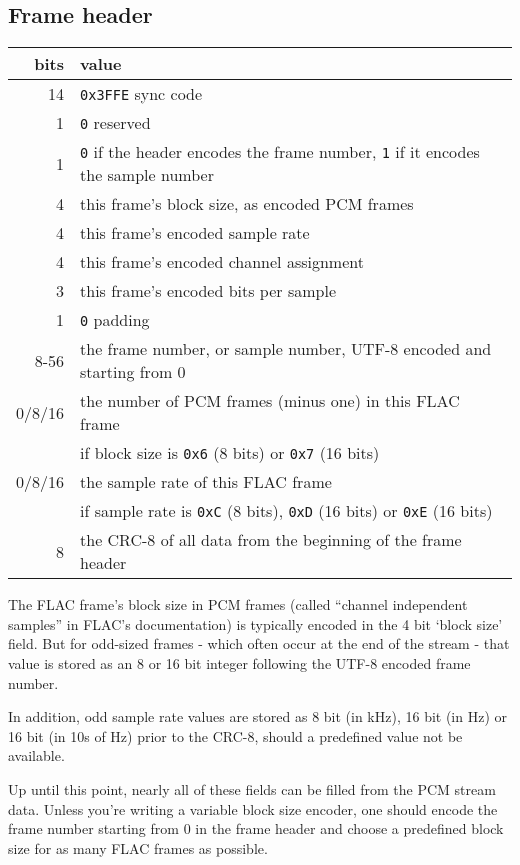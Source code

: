 \subsection{Frame header}
\begin{table}[h]
\begin{tabular}{|r|l|}
\hline
bits & value \\
\hline
14 & \texttt{0x3FFE} sync code \\
1 & \texttt{0} reserved \\
1 & \texttt{0} if the header encodes the frame number, \texttt{1} if it encodes the sample number \\
4 & this frame's block size, as encoded PCM frames \\
4 & this frame's encoded sample rate \\
4 & this frame's encoded channel assignment \\
3 & this frame's encoded bits per sample \\
1 & \texttt{0} padding \\
8-56 & the frame number, or sample number, UTF-8 encoded and starting from 0 \\
0/8/16 & the number of PCM frames (minus one) in this FLAC frame \\
& if block size is \texttt{0x6} (8 bits) or \texttt{0x7} (16 bits) \\
0/8/16 & the sample rate of this FLAC frame \\
& if sample rate is \texttt{0xC} (8 bits), \texttt{0xD} (16 bits) or \texttt{0xE} (16 bits) \\
8 & the CRC-8 of all data from the beginning of the frame header \\
\hline
\end{tabular}
\end{table}
\par
\noindent
The FLAC frame's block size in PCM frames
(called ``channel independent samples'' in FLAC's documentation)
is typically encoded in the 4 bit `block size' field.
But for odd-sized frames - which often occur at the end of the stream -
that value is stored as an 8 or 16 bit integer following the UTF-8 encoded
frame number.

In addition, odd sample rate values are stored as 8 bit (in kHz),
16 bit (in Hz) or 16 bit (in 10s of Hz) prior to the CRC-8,
should a predefined value not be available.

Up until this point, nearly all of these fields can be filled from
the PCM stream data.
Unless you're writing a variable block size encoder,
one should encode the frame number starting from 0 in the frame header
and choose a predefined block size for as many FLAC frames as possible.

